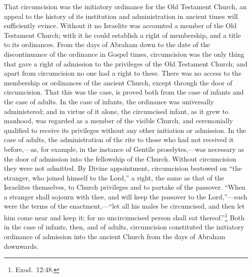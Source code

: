 \documentclass[
]{book}
\begin{document}
That circumcision was the initiatory ordinance for the Old Testament Church, an appeal to the history of its institution and administration in ancient times will sufficiently evince. Without it no Israelite was accounted a member of the Old Testament Church; with it he could establish a right of membership, and a title to its ordinances. From the days of Abraham down to the date of the discontinuance of the ordinance in Gospel times, circumcision was the only thing that gave a right of admission to the privileges of the Old Testament Church; and apart from circumcision no one had a right to these. There was no access to the membership or ordinances of the ancient Church, except through the door of circumcision. That this was the case, is proved both from the case of infants and the case of adults. In the case of infants, the ordinance was universally administered; and in virtue of it alone, the circumcised infant, as it grew to manhood, was regarded as a member of the visible Church, and ceremonially qualified to receive its privileges without any other initiation or admission. In the case of adults, the administration of the rite to those who had not received it before,---as, for example, in the instance of Gentile proselytes,---was necessary as the door of admission into the fellowship of the Church. Without circumcision they were not admitted. By Divine appointment, circumcision bestowed on ``the stranger, who joined himself to the Lord,'' a right, the same as that of the Israelites themselves, to Church privileges and to partake of the passover. ``When a stranger shall sojourn with thee, and will keep the passover to the Lord,''---such were the terms of the enactment,---``let all his males be circumcised, and then let him come near and keep it; for no uncircumcised person shall eat thereof.''\footnote{Exod.~12:48.} Both in the case of infants, then, and of adults, circumcision constituted the initiatory ordinance of admission into the ancient Church from the days of Abraham downwards.
\end{document}

